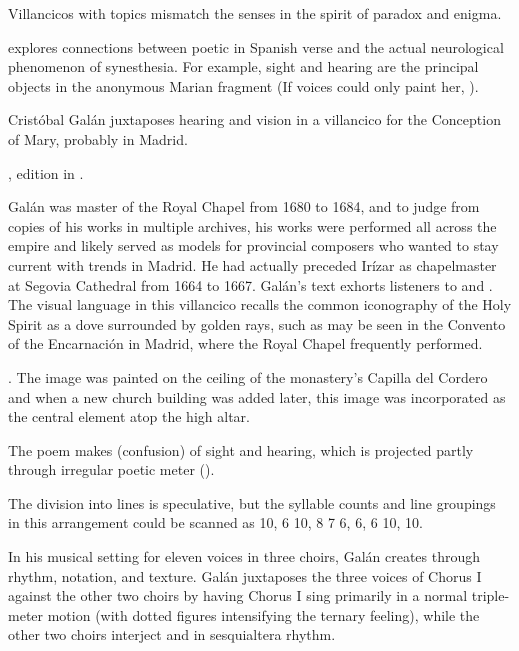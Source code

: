 
Villancicos with  topics mismatch the senses in the spirit
of paradox and enigma.%
\begin{Footnote}
    \Autocite{DoetschKraus:Sinestesia} explores connections between poetic
     in Spanish verse and the actual
    neurological phenomenon of synesthesia.  
    For example, sight and hearing are the principal objects in the anonymous
    Marian fragment  (If voices
    could only paint her, ).
\end{Footnote}
Cristóbal Galán juxtaposes hearing and vision in a villancico for the Conception
of Mary, probably in Madrid.%
\begin{Footnote}
    , edition in \autocite[567--568]{CaberoPueyo:PhD}.
\end{Footnote}
Galán was master of the Royal Chapel from 1680 to 1684, and to judge from copies
of his works in multiple archives, his works were performed all across the
empire and likely served as models for provincial composers who wanted to stay
current with trends in Madrid.
He had actually preceded Irízar as chapelmaster at Segovia Cathedral from 1664
to 1667.%
    \Autocite{Baron-Sage:GalanC}
Galán's text exhorts listeners to  and .
The visual language in this villancico recalls the common iconography of the
Holy Spirit as a dove surrounded by golden rays, such as may be seen in the
Convento of the Encarnación in Madrid, where the Royal Chapel frequently
performed.%
\begin{Footnote}
    \Autocite[69--70, 81]{Sanz:GuiaDescalzasEncarnacion}.
    The image was painted on the ceiling of the monastery's Capilla del Cordero
    and when a new church building was added later, this image was incorporated
    as the central element atop the high altar.
\end{Footnote}
The poem makes  (confusion) of sight and hearing, which is
projected partly through irregular poetic meter
().%
\begin{Footnote}
    The division into lines is speculative, but the syllable counts and line
    groupings in this arrangement could be scanned as  10, 6 10, 8 7 6, 6, 6 10,
    10.
\end{Footnote}
In his musical setting for eleven voices in three choirs, Galán creates
 through rhythm, notation, and texture.  
Galán juxtaposes the three voices of Chorus I against the other two choirs by
having Chorus I sing primarily in a normal triple-meter motion (with dotted
figures intensifying the ternary feeling), while the other two choirs interject
 and  in sesquialtera rhythm.

